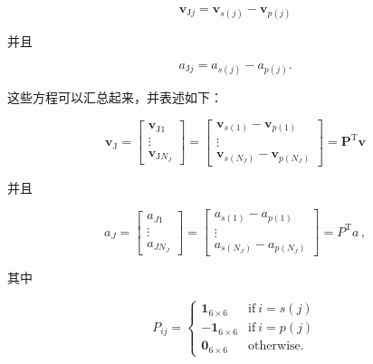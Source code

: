 \documentclass[10pt,a4paper]{book}
\theoremstyle{thmstyle} %
\theoremstyle{defstyle} %
\theoremstyle{prostyle} %
\begin{document}
$$
{ \boldsymbol { v } } _ { \mathrm { J } j } = { \boldsymbol { v } } _ { s ( j ) } - { \boldsymbol { v } } _ { p ( j ) }
$$



并且



$$
a _ { \mathrm { J } j } = a _ { s ( j ) } - a _ { p ( j ) } .
$$



这些方程可以汇总起来，并表述如下：



$$
\boldsymbol{ v } _ { \mathrm { J } } = \left[ \begin{array}{l} { \boldsymbol{ v } _ { \mathrm { J } 1 } } \\{ \vdots } \\{ \boldsymbol{ v } _ { \mathrm { J } N _ { J } } } \end{array} \right] = \left[ \begin{array}{l} { \boldsymbol{ v } _ { s ( 1 ) } - \boldsymbol{ v } _ { p ( 1 ) } } \\{ \vdots } \\{ \boldsymbol{ v } _ { s ( N _ { J } ) } - \boldsymbol{ v } _ { p ( N _ { J } ) } } \end{array} \right] = \boldsymbol{ P } ^{\mathrm { T} } \boldsymbol{ v }
$$



并且



$$
a _ { J } = \left[ \begin{array}{l} { a _ { J 1 } } \\{ \vdots } \\{ a _ { J N _ { J } } } \end{array} \right] = \left[ \begin{array}{l} { a _ { s ( 1 ) } - a _ { p ( 1 ) } } \\{ \vdots } \\{ a _ { s ( N _ { J } ) } - a _ { p ( N _ { J } ) } } \end{array} \right] = P ^{\mathrm { T} } a \, ,
$$



其中



$$
P _ { i j } = \left\{ \begin{array}{ll} { { \mathbf { 1 } _ { 6 \times 6 } } } & { { \mathrm { i f ~ } i = s ( j ) } } \\{ { - \mathbf { 1 } _ { 6 \times 6 } } } & { { \mathrm { i f ~ } i = p ( j ) } } \\{ { \mathbf { 0 } _ { 6 \times 6 } } } & { { \mathrm { o t h e r w i s e } . } } \end{array} \right.
$$
\end{document}
